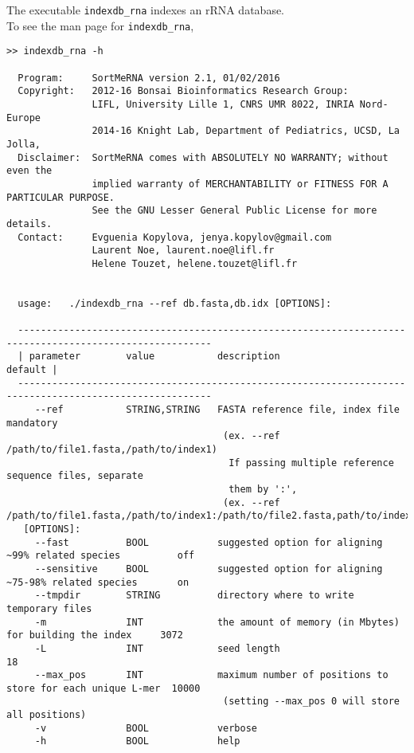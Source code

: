 \documentclass[10pt,a4paper]{article}
\begin{document}
\noindent The executable \texttt{indexdb\_rna} indexes an rRNA database.\\

\noindent To see the man page for \texttt{indexdb\_rna}, 

\begin{Verbatim}[fontsize=\footnotesize]
>> indexdb_rna -h

  Program:     SortMeRNA version 2.1, 01/02/2016
  Copyright:   2012-16 Bonsai Bioinformatics Research Group:
               LIFL, University Lille 1, CNRS UMR 8022, INRIA Nord-Europe
               2014-16 Knight Lab, Department of Pediatrics, UCSD, La Jolla,
  Disclaimer:  SortMeRNA comes with ABSOLUTELY NO WARRANTY; without even the
               implied warranty of MERCHANTABILITY or FITNESS FOR A PARTICULAR PURPOSE.
               See the GNU Lesser General Public License for more details.
  Contact:     Evguenia Kopylova, jenya.kopylov@gmail.com 
               Laurent Noe, laurent.noe@lifl.fr
               Helene Touzet, helene.touzet@lifl.fr


  usage:   ./indexdb_rna --ref db.fasta,db.idx [OPTIONS]:

  --------------------------------------------------------------------------------------------------------
  | parameter        value           description                                                 default |
  --------------------------------------------------------------------------------------------------------
     --ref           STRING,STRING   FASTA reference file, index file                            mandatory
                                      (ex. --ref /path/to/file1.fasta,/path/to/index1)
                                       If passing multiple reference sequence files, separate
                                       them by ':',
                                      (ex. --ref /path/to/file1.fasta,/path/to/index1:/path/to/file2.fasta,path/to/index2)
   [OPTIONS]:
     --fast          BOOL            suggested option for aligning ~99% related species          off
     --sensitive     BOOL            suggested option for aligning ~75-98% related species       on
     --tmpdir        STRING          directory where to write temporary files
     -m              INT             the amount of memory (in Mbytes) for building the index     3072 
     -L              INT             seed length                                                 18
     --max_pos       INT             maximum number of positions to store for each unique L-mer  10000
                                      (setting --max_pos 0 will store all positions)
     -v              BOOL            verbose
     -h              BOOL            help
\end{Verbatim}
\end{document}
